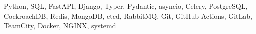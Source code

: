 \hspace{0.2in}Python, SQL, FastAPI, Django, Typer, Pydantic, asyncio, Celery,
PostgreSQL, CockroachDB, Redis, MongoDB, etcd, RabbitMQ, Git,
GitHub Actions, GitLab, TeamCity, Docker, NGINX, systemd
